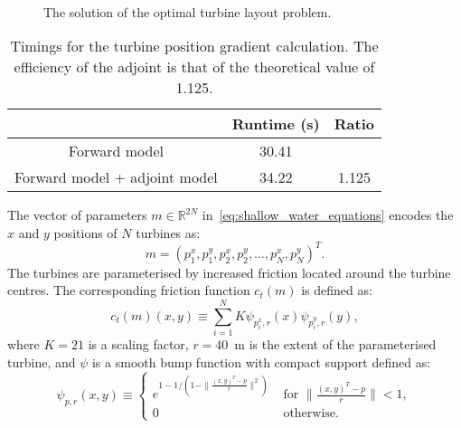 \documentclass[prodmode,acmtoms]{acmsmall}
\begin{document}
\begin{figure}[t]
\centering
        \\
        \hspace{2cm}
        \caption{The solution of the optimal turbine layout problem.}\label{fig:turbine_optimisation}
\end{figure}
\begin{table}
\centering
\begin{tabular}{ccc}
\toprule
       & Runtime (s) & Ratio \\
\midrule
Forward model &  30.41  &     \\
Forward model + adjoint model & 34.22 & 1.125 \\
\bottomrule
\end{tabular}
\caption{Timings for the turbine position gradient calculation. The efficiency of the adjoint is that of the theoretical value of 1.125.}
\label{tab:turbine-timings}
\end{table}

The vector of parameters $m \in \mathbb R^{2N}$ in~\eqref{eq:shallow_water_equations} encodes the $x$ and $y$ positions of $N$ turbines as:
\begin{equation*}
  m = (p_1^x, p_1^y, p_2^x, p_2^y, \dots, p_N^x, p_N^y)^T. 
\end{equation*}
The turbines are parameterised by increased friction located around the turbine centres.
The corresponding friction function $c_t(m)$ is defined as: 
\begin{equation}
 c_t(m)(x, y) \equiv \sum_{i=1}^{N} K \psi_{p_i^x, r}(x) \psi_{p_i^y, r}(y),
\label{eq:turbine_function}
\end{equation}
where $K=21$ is a scaling factor, $r = 40$~m is the extent of the parameterised turbine, and $\psi$ is a smooth bump function with compact support defined as:
\begin{equation*}
\psi_{p, r}(x, y) \equiv
\begin{cases}
  e^{1-1/(1-\|\frac{(x,y)^T - p}{r}\|^2)} &  \mbox{ for } \|\frac{(x,y)^T - p}{r}\| < 1, \\
  0 & \textrm{ otherwise.}
\end{cases}\label{eq:1Dbump_function}
\end{equation*}
\end{document}
